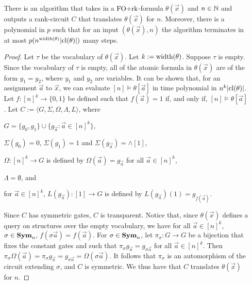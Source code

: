 \documentclass[../paper.tex]{subfiles}
\begin{document}
\begin{lem}
  There is an algorithm that takes in a $\text{\upshape FO+rk}$-formula $\theta(\vec{x})$ and $n
  \in \mathbb{N}$ and outputs a rank-circuit $C$ that translates $\theta(\vec{x})$
  for $n$. Moreover, there is a polynomial in $p$ such that for an input
  $(\theta(\vec{x}), n)$ the algorithm terminates in at most
  $p(n^{\mathrm{width}(\theta)}\vert \mathrm{cl}(\theta) \vert)$ many steps.
  \label{lem:translating-FOrk}
\end{lem}
\begin{proof}
  Let $\tau$ be the vocabulary of $\theta(\vec{x})$. Let $k := \mathrm{width}(\theta)$.
  Suppose $\tau$ is empty. Since the vocabulary of $\tau$ is empty, all of the
  atomic formula in $\theta(\vec{x})$ are of the form $y_1 = y_2$, where $y_1$
  and $y_2$ are variables. It can be shown that, for an assignment $\vec{a}$ to
  $\vec{x}$, we can evaluate $[n] \models \theta[\vec{a}]$ in time polynomial in
  $n^{k} \vert \mathrm{cl}(\theta) \vert$. Let $f : [n]^k \rightarrow \{0,1\}$ be
  defined such that $f (\vec{a}) = 1$ if, and only if, $[n] \models
  \theta[\vec{a}]$. Let $C := \langle G, \Sigma, \Omega, \Lambda, L \rangle$,
  where
  \begin{itemizens}
  \item $G = \{g_0, g_1\} \cup \{g_{\vec{a}} : \vec{a} \in [n]^{k}\}$,
  \item $\Sigma (g_0) = 0$, $\Sigma (g_1) = 1$ and $\Sigma (g_{\vec{a}}) =
    \land[1]$,
  \item $\Omega : [n]^k \rightarrow G$ is defined by $\Omega(\vec{a}) =
    g_{\vec{a}}$ for all $\vec{a} \in [n]^k$,
  \item $\Lambda = \emptyset$, and
  \item for $\vec{a} \in [n]^k$, $L(g_{\vec{a}}) : [1] \rightarrow G$ is defined
    by $L(g_{\vec{a}})(1) = g_{f(\vec{a})}$.
  \end{itemizens}
  
  Since $C$ has symmetric gates, $C$ is transparent. Notice that, since
  $\theta(\vec{x})$ defines a query on structures over the empty vocabulary, we
  have for all $\vec{a} \in [n]^k$, $\sigma \in \text{\textbf{Sym}}_n$, $f(\sigma \vec{a}) =
  f(\vec{a})$. For $\sigma \in \text{\textbf{Sym}}_n$, let $\pi_\sigma : G \rightarrow G$ be a
  bijection that fixes the constant gates and such that $\pi_{\sigma}
  g_{\vec{a}} = g_{\sigma \vec{a}}$ for all $\vec{a} \in [n]^k$. Then
  $\pi_\sigma \Omega (\vec{a}) = \pi_\sigma g_{\vec{a}} = g_{\sigma \vec{a}} =
  \Omega (\sigma \vec{a})$. It follows that $\pi_\sigma$ is an automorphism of
  the circuit extending $\sigma$, and $C$ is symmetric. We thus have that $C$
  translates $\theta(\vec{x})$ for $n$.


\end{proof}
\end{document}
